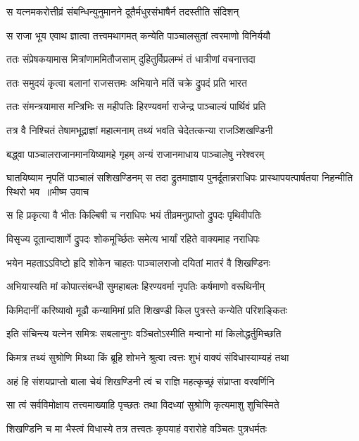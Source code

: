 \twolineshloka
{स यत्नमकरोत्तीव्रं संबन्धिन्युनुमानने}
{दूतैर्मधुरसंभाषैर्न तदस्तीति संदिशन्}


\twolineshloka
{स राजा भूय एवाथ ज्ञात्वा तत्त्वमथागमत्}
{कन्येति पाञ्चालसुतां त्वरमाणो विनिर्ययौ}


\twolineshloka
{ततः संप्रेषकयामास मित्रांणाममितौजसाम्}
{दुहितुर्विप्रलम्भं तं धात्रीणां वचनात्तदा}


\twolineshloka
{ततः समुदयं कृत्वा बलानां राजसत्तमः}
{अभियाने मतिं चक्रे द्रुपदं प्रति भारत}


\twolineshloka
{ततः संमन्त्रयामास मन्त्रिभिः स महीपतिः}
{हिरण्यवर्मा राजेन्द्र पाञ्चाल्यं पार्थिवं प्रति}


\twolineshloka
{तत्र वै निश्चितं तेषामभूद्राज्ञां महात्मनाम्}
{तथ्यं भवति चेदेतत्कन्या राजञ्शिखण्डिनी}


\twolineshloka
{बद्ध्वा पाञ्चालराजानमानयिष्यामहे गृहम्}
{अन्यं राजानमाधाय पाञ्चालेषु नरेश्वरम्}


घातयिष्याम नृपतिं पाञ्चालं सशिखण्डिनम्
\threelineshloka
{स तदा द्रुतमाज्ञाय पुनर्दूतान्नराधिपः}
{प्रास्थापयत्पार्षतया निहन्मीति स्थिरो भव ॥भीष्म उवाच}
{}


\twolineshloka
{स हि प्रकृत्या वै भीतः किल्बिषी च नराधिपः}
{भयं तीव्रमनुप्राप्तो द्रुपदः पृथिवीपतिः}


\twolineshloka
{विसृज्य दूतान्दाशार्णे द्रुपदः शोकमूर्च्छितः}
{समेत्य भार्यां रहिते वाक्यमाह नराधिपः}


\twolineshloka
{भयेन महताऽऽविष्टो हृदि शोकेन चाहतः}
{पाञ्चालराजो दयितां मातरं वै शिखण्डिनः}


\twolineshloka
{अभियास्यति मां कोपात्संबन्धी सुमहाबलः}
{हिरण्यवर्मा नृपतिः कर्षमाणो वरूथिनीम्}


\twolineshloka
{किमिदानीं करिष्यावो मूढौ कन्यामिमां प्रति}
{शिखण्डी किल पुत्रस्ते कन्येति परिशङ्कितः}


\twolineshloka
{इति संचिन्त्य यत्नेन समित्रः सबलानुगः}
{वञ्चितोऽस्मीति मन्वानो मां किलोद्धर्तुमिच्छति}


\twolineshloka
{किमत्र तथ्यं सुश्रोणि मिथ्या किं ब्रूहि शोभने}
{श्रुत्वा त्वत्तः शुभं वाक्यं संविधास्याम्यहं तथा}


\twolineshloka
{अहं हि संशयप्राप्तो बाला चेयं शिखण्डिनी}
{त्वं च राज्ञि महत्कृच्छ्रं संप्राप्ता वरवर्णिनि}


\twolineshloka
{सा त्वं सर्वविमोक्षाय तत्त्वमाख्याहि पृच्छतः}
{तथा विदध्यां सुश्रोणि कृत्यमाशु शुचिस्मिते}


\twolineshloka
{शिखण्डिनि च मा भैस्त्वं विधास्ये तत्र तत्त्वतः}
{कृपयाहं वरारोहे वञ्चितः पुत्रधर्मतः}


